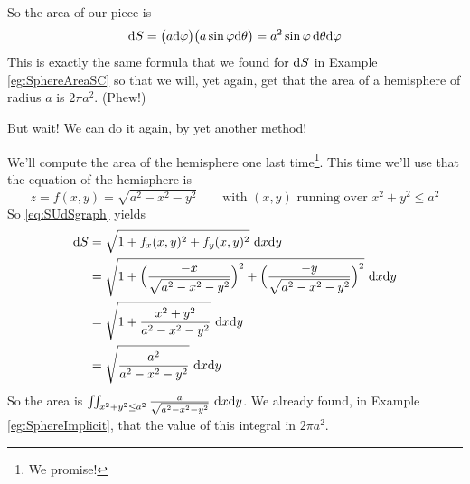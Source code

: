 \begin{eg}
\begin{efig}
\begin{center}
\end{center}
\end{efig}
So the area of our piece is 
\begin{equation*}
\mathrm{d}S = \big(a\mathrm{d}\varphi\big)\big(a\sin\varphi\mathrm{d}\theta\big)
= a^2\sin\varphi\,\mathrm{d}\theta\mathrm{d}\varphi
\end{equation*}
This is exactly the same formula that we found for $\mathrm{d}S$ in
Example \ref{eg:SphereAreaSC} so that we will, yet again, get that the
area of a hemisphere of radius $a$ is $2\pi a^2$. (Phew!)
\end{eg}

But wait! We can do it again, by yet another method!
\begin{eg}[Area of a hemisphere --- using $z=f(x,y)$]
       \label{eg:SphereGraph}
We'll compute the area of the hemisphere one last time\footnote{We promise!}. This time
we'll use that the equation of the hemisphere is 
\begin{equation*}
z=f(x,y) = \sqrt{a^2-x^2-y^2} 
\qquad\text{with $(x,y)$ running over $x^2+y^2\le a^2$}
\end{equation*}
So \eqref{eq:SUdSgraph} yields
\begin{align*}
\mathrm{d}S&= \sqrt{1 + f_x(x,y)^2 + f_y(x,y)^2}\  \mathrm{d}x\mathrm{d}y \\
   &=\sqrt{1+\Big(\frac{-x}{\sqrt{a^2-x^2-y^2}}\Big)^2
            +\Big(\frac{-y}{\sqrt{a^2-x^2-y^2}}\Big)^2} \ \mathrm{d}x\mathrm{d}y \\
   &=\sqrt{1+\frac{x^2+y^2}{a^2-x^2-y^2}} \ \mathrm{d}x\mathrm{d}y \\
   &=\sqrt{\frac{a^2}{a^2-x^2-y^2}} \ \mathrm{d}x\mathrm{d}y 
\end{align*}
So the area is
$
\iint_{x^2+y^2\le a^2}\frac{a}{\sqrt{a^2-x^2-y^2}}
            \ \mathrm{d}x\mathrm{d}y 
$. We already found, in Example \ref{eg:SphereImplicit}, that the value 
of this integral in $2\pi a^2$.
\end{eg}

